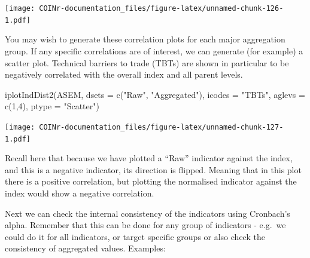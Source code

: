 \documentclass[
]{book}
\newenvironment{Shaded}{\begin{snugshade}}{\end{snugshade}}
\newcommand{\AttributeTok}[1]{\textcolor[rgb]{0.77,0.63,0.00}{#1}}
\newcommand{\DecValTok}[1]{\textcolor[rgb]{0.00,0.00,0.81}{#1}}
\newcommand{\FunctionTok}[1]{\textcolor[rgb]{0.00,0.00,0.00}{#1}}
\newcommand{\NormalTok}[1]{#1}
\newcommand{\StringTok}[1]{\textcolor[rgb]{0.31,0.60,0.02}{#1}}
\begin{document}
\texttt{[image: COINr-documentation\_files/figure-latex/unnamed-chunk-126-1.pdf]}

You may wish to generate these correlation plots for each major aggregation group. If any specific correlations are of interest, we can generate (for example) a scatter plot. Technical barriers to trade (TBTs) are shown in particular to be negatively correlated with the overall index and all parent levels.

\begin{Shaded}
\begin{Highlighting}[]
\FunctionTok{iplotIndDist2}\NormalTok{(ASEM, }\AttributeTok{dsets =} \FunctionTok{c}\NormalTok{(}\StringTok{"Raw"}\NormalTok{, }\StringTok{"Aggregated"}\NormalTok{), }\AttributeTok{icodes =} \StringTok{"TBTs"}\NormalTok{, }\AttributeTok{aglevs =} \FunctionTok{c}\NormalTok{(}\DecValTok{1}\NormalTok{,}\DecValTok{4}\NormalTok{), }\AttributeTok{ptype =} \StringTok{"Scatter"}\NormalTok{)}
\end{Highlighting}
\end{Shaded}

\texttt{[image: COINr-documentation\_files/figure-latex/unnamed-chunk-127-1.pdf]}

Recall here that because we have plotted a ``Raw'' indicator against the index, and this is a negative indicator, its direction is flipped. Meaning that in this plot there is a positive correlation, but plotting the normalised indicator against the index would show a negative correlation.

Next we can check the internal consistency of the indicators using Cronbach's alpha. Remember that this can be done for any group of indicators - e.g.~we could do it for all indicators, or target specific groups or also check the consistency of aggregated values. Examples:
\end{document}
